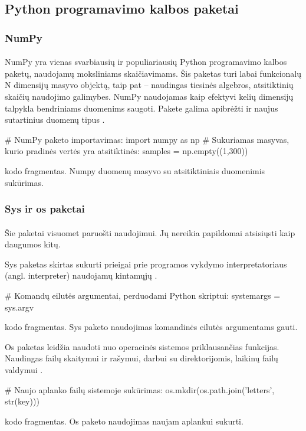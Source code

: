 \documentclass[a4paper,12pt]{article}
\begin{document}
\subsection{Python programavimo kalbos paketai}
\subsubsection{NumPy}
\paragraph{} NumPy yra vienas svarbiausių ir populiariausių Python programavimo kalbos paketų, naudojamų moksliniams skaičiavimams. Šis paketas turi labai funkcionalų N dimensijų masyvo objektą, taip pat – naudingas tiesinės algebros, atsitiktinių skaičių naudojimo galimybes. NumPy naudojamas kaip efektyvi kelių dimensijų talpykla bendriniams duomenims saugoti. Pakete galima apibrėžti ir naujus sutartinius duomenų tipus \cite{NUMPY}.
	\begin{listing}[H]
		\begin{pythoncode}
# NumPy paketo importavimas:
import numpy as np
# Sukuriamas masyvas, kurio pradinės vertės yra atsitiktinės:
samples =  np.empty((1,300))
		\end{pythoncode}
		\caption{kodo fragmentas. Numpy duomenų masyvo su atsitiktiniais duomenimis sukūrimas.}		
	\end{listing}


\subsubsection{Sys ir os paketai}
\paragraph{} Šie paketai visuomet paruošti naudojimui. Jų nereikia papildomai atsisiųsti kaip daugumos kitų.

Sys paketas skirtas sukurti prieigai prie programos vykdymo interpretatoriaus (angl. interpreter) naudojamų kintamųjų \cite{SYS}.
	\begin{listing}[H]
		\begin{pythoncode}
# Komandų eilutės argumentai, perduodami Python skriptui:
systemargs = sys.argv
		\end{pythoncode}
		\caption{kodo fragmentas. Sys paketo naudojimas komandinės eilutės argumentams gauti.}	
	\end{listing}

Os paketas leidžia naudoti nuo operacinės sistemos priklausančias funkcijas. Naudingas failų skaitymui ir rašymui, darbui su direktorijomis, laikinų failų valdymui \cite{OS}.
	\begin{listing}[H]
		\begin{pythoncode}
# Naujo aplanko failų sistemoje sukūrimas:
os.mkdir(os.path.join('letters', str(key)))
		\end{pythoncode}
		\caption{kodo fragmentas. Os paketo naudojimas naujam aplankui sukurti.}	
	\end{listing}
	
\end{document}
